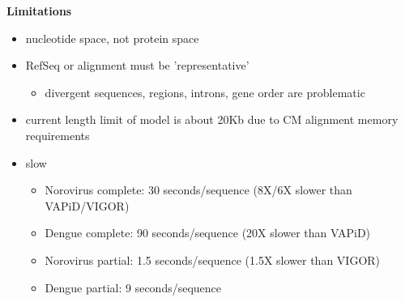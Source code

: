 \documentclass[landscape]{slides}
\begin{document}
\begin{slide}
\begin{center}
\textbf{Limitations}
\end{center}

\small
\begin{itemize}
\item nucleotide space, not protein space
\item RefSeq or alignment must be 'representative'
  \begin{itemize}
    \item divergent sequences, regions, introns, gene order are problematic
  \end{itemize}
\item current length limit of model is about 20Kb due to CM alignment memory
  requirements
\item slow
  \begin{itemize}
  \item Norovirus complete: 30 seconds/sequence (8X/6X slower than
    VAPiD/VIGOR)
  \item Dengue complete: 90 seconds/sequence (20X slower than VAPiD)
  \item Norovirus partial: 1.5 seconds/sequence (1.5X slower than VIGOR)
  \item Dengue partial: 9 seconds/sequence
  \end{itemize}
\end{itemize}

\vfill
\end{slide}
\end{document}

